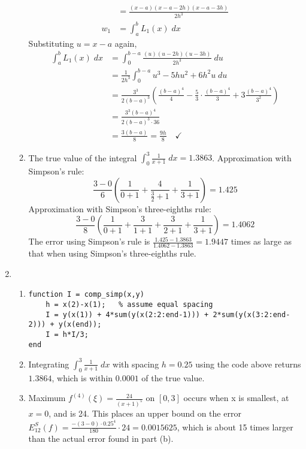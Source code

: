 \documentclass[11pt,letterpaper]{article}
\begin{document}
\begin{enumerate}
\begin{enumerate}
\begin{align*}
                 &= \frac{(x-a)(x-a-2h)(x-a-3h)}{2h^3} \\
          w_1 &= \int_a^bL_1(x)\;dx
        \end{align*}
        Substituting $u = x-a$ again,
        \begin{align*}
          \int_a^bL_1(x)\;dx &= \int_0^{b-a} \frac{(u)(u-2h)(u-3h)}{2h^3}\;du \\
                             &= \frac{1}{2h^3} \int_0^{b-a}u^3-5hu^2+6h^2u\;du \\
                             &= \frac{3^3}{2(b-a)^3} \left(\frac{(b-a)^4}{4} - \frac53\cdot\frac{(b-a)^4}{3} + 3\frac{(b-a)^4}{3^2}\right) \\
                             &= \frac{3^3(b-a)^4}{2(b-a)^3\cdot36} \\
                             &= \frac{3(b-a)}{8} = \frac{9h}{8} \quad \checkmark
        \end{align*}

      \item The true value of the integral $\int_0^3\frac{1}{x+1}\;dx = 1.3863$.
        Approximation with Simpson's rule:
        \[\frac{3-0}{6}\left(\frac{1}{0+1} + \frac{4}{\frac32+1} + \frac{1}{3+1}\right) = 1.425\]
        Approximation with Simpson's three-eighths rule:
        \[\frac{3-0}{8}\left(\frac{1}{0+1} + \frac{3}{1+1} + \frac{3}{2+1} + \frac{1}{3+1}\right) = 1.4062\]
        The error using Simpson's rule is $\frac{1.425-1.3863}{1.4062-1.3863}
        = 1.9447$ times as large as that when using Simpson's three-eighths
        rule.
    \end{enumerate}

  \item
    \begin{enumerate}
      \item
        {\footnotesize
        \begin{verbatim}
function I = comp_simp(x,y)
    h = x(2)-x(1);   % assume equal spacing
    I = y(x(1)) + 4*sum(y(x(2:2:end-1))) + 2*sum(y(x(3:2:end-2))) + y(x(end));
    I = h*I/3;
end
        \end{verbatim}}

      \item Integrating $\int_0^3\frac{1}{x+1}\;dx$ with spacing $h=0.25$ using
        the code above returns $1.3864$, which is within $0.0001$ of the true
        value.

      \item Maximum $f^{(4)}(\xi) = \frac{24}{(x+1)^5}$ on $[0,3]$ occurs when
        x is smallest, at $x=0$, and is 24. This places an upper bound on the
        error $E_{12}^S(f)
        = \frac{-(3-0)\cdot0.25^4}{180}\cdot24
        = \boxed{0.0015625}$, which is about 15 times larger than the actual
        error found in part (b).


\end{enumerate}
\end{enumerate}
\end{document}
